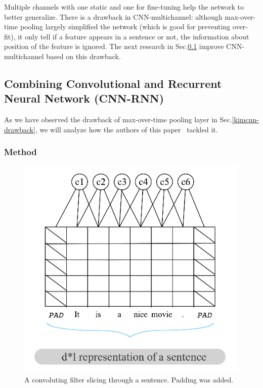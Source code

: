 Multiple channels with one static and one for fine-tuning help the network to better generalize.
There is a drawback in CNN-multichannel: although max-over-time pooling largely simplified the network (which is good for preventing over-fit), it only tell if a feature appears in a sentence or not, the information about position of the feature is ignored.\label{kim-drawback}
The next research in Sec.\ref{cnn-rnn}  improve CNN-multichannel based on this drawback.


\subsection{Combining Convolutional and Recurrent Neural Network (CNN-RNN)}\label{cnn-rnn}
As we have observed the drawback of max-over-time pooling layer in Sec.\ref{kimcnn-drawback}, we will analyze how the authors of this paper~\cite{cnn-rnn} tackled it.

\subsubsection{Method}
\begin{figure}[H]
    \centering
\includegraphics[scale=0.45]{figure/conv-word}
    \caption[Convolution with padding]{A convoluting filter slicing through a sentence.
    Padding was added.}
    \label{fig:conv-word}
\end{figure}

